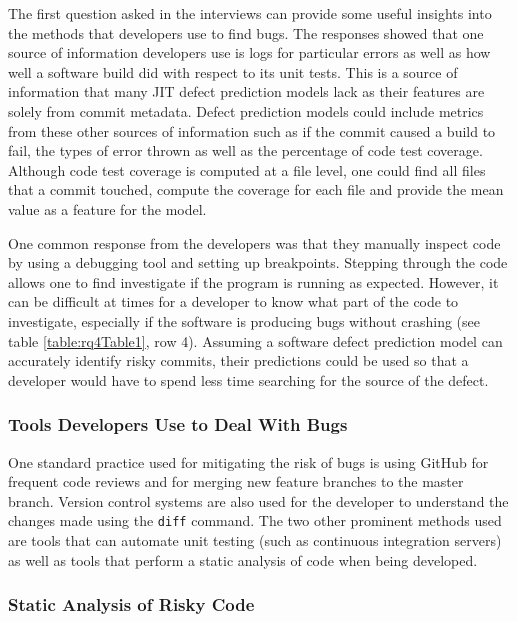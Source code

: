 \documentclass[../main.tex]{subfiles}
\begin{document}
The first question asked in the interviews can provide some useful insights into the methods that developers use to find bugs. The responses showed that one source of information developers use is logs for particular errors as well as how well a software build did with respect to its unit tests. This is a source of information that many JIT defect prediction models lack as their features are solely from commit metadata. Defect prediction models could include metrics from these other sources of information such as if the commit caused a build to fail, the types of error thrown as well as the percentage of code test coverage. Although code test coverage is computed at a file level, one could find all files that a commit touched, compute the coverage for each file and provide the mean value as a feature for the model. 

One common response from the developers was that they manually inspect code by using a debugging tool and setting up breakpoints. Stepping through the code allows one to find investigate if the program is running as expected. However, it can be difficult at times for a developer to know what part of the code to investigate, especially if the software is producing bugs without crashing (see table \ref{table:rq4Table1}, row 4). Assuming a software defect prediction model can accurately identify risky commits, their predictions could be used so that a developer would have to spend less time searching for the source of the defect.

\subsubsection{Tools Developers Use to Deal With Bugs}

One standard practice used for mitigating the risk of bugs is using GitHub for frequent code reviews and for merging new feature branches to the master branch. Version control systems are also used for the developer to understand the changes made using the \texttt{diff} command. The two other prominent methods used are tools that can automate unit testing (such as continuous integration servers) as well as tools that perform a static analysis of code when being developed. 

\subsubsection{Static Analysis of Risky Code}
\end{document}
